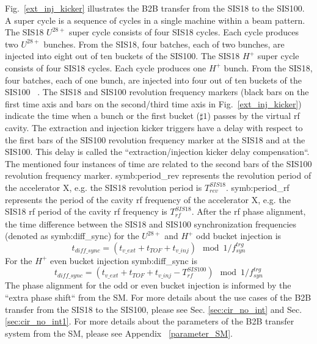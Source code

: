Fig.~\ref{ext_inj_kicker} illustrates the B2B transfer from the SIS18 to the SIS100. A super cycle is a sequence of cycles in a single machine within a beam pattern. The SIS18 $U^{28+}$ super cycle consists of four SIS18 cycles. Each cycle produces two $U^{28+}$ bunches. From the SIS18, four batches, each of two bunches, are injected into eight out of ten buckets of the SIS100. The SIS18 $H^{+}$ super cycle consists of four SIS18 cycles. Each cycle produces one $H^{+}$ bunch. From the SIS18, four batches, each of one bunch, are injected into four out of ten buckets of the SIS100 ~\cite{liebermann_fair_2013, liebermann_sis100_2013}. The SIS18 and SIS100 revolution frequency markers (black bars on the first time axis and bars on the second/third time axis in Fig.~\ref{ext_inj_kicker}) indicate the time when a bunch or the first bucket ($\sharp1$) passes by the virtual rf cavity. The extraction and injection kicker triggers have a delay with respect to the first bars of the SIS100 revolution frequency marker at the SIS18 and at the SIS100. This delay is called the ``extraction/injection kicker delay compensation``. The mentioned four instances of time are related to the second bars of the SIS100 revolution frequency marker. \gls{symb:period_rev} represents the revolution period of the accelerator X, e.g. the SIS18 revolution period is $T_{\mathit{rev}}^{\mathit{SIS18}}$. \gls{symb:period_rf} represents the period of the cavity rf frequency of the accelerator X, e.g. the SIS18 rf period of the cavity rf frequency is $T_{\mathit{rf}}^{\mathit{SIS18}}$. After the rf phase alignment, the time difference between the SIS18 and SIS100 synchronization frequencies (denoted as \gls{symb:diff_sync}) for the $U^{28+}$ and $H^{+}$ odd bucket injection is
\begin{equation}
	t_{\mathit{diff\_sync}}=(t_{\mathit{v\_ext}}+t_{\mathit{TOF}}+t_{\mathit{v\_inj}}) \mod 1/f_\mathit{syn}^\mathit{trg}
\end{equation}
For the $H^{+}$ even bucket injection \gls{symb:diff_sync} is
\begin{equation}
t_{\mathit{diff\_sync}}=(t_{\mathit{v\_ext}}+t_{\mathit{TOF}}+t_{\mathit{v\_inj}}- T_{\mathit{rf}}^{\mathit{SIS100}}) \mod 1/f_\mathit{syn}^\mathit{trg} 
\end{equation}
The phase alignment for the odd or even bucket injection is informed by the ``extra phase shift`` from the SM. For more details about the use cases of the B2B transfer from the SIS18 to the SIS100, please see Sec. \ref{sec:cir_no_int} and Sec. \ref{sec:cir_no_int1}. For more details about the parameters of the B2B transfer system from the SM, please see Appendix ~\ref{parameter_SM}.  

